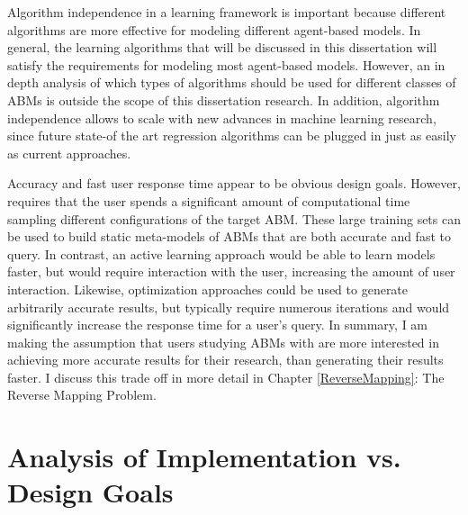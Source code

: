 Algorithm independence in a learning framework is important because different algorithms are more effective for modeling different agent-based models.
In general, the learning algorithms that will be discussed in this dissertation will satisfy the requirements for modeling most agent-based models.
However, an in depth analysis of which types of algorithms should be used for different classes of ABMs is outside the scope of this dissertation research.
In addition, algorithm independence allows \fw to scale with new advances in machine learning research, since future state-of the art regression algorithms can be plugged in just as easily as current approaches.

Accuracy and fast user response time appear to be obvious design goals.
However, \fw requires that the user spends a significant amount of computational time sampling different configurations of the target ABM.
These large training sets can be used to build static meta-models of ABMs that are both accurate and fast to query.
In contrast, an active learning approach would be able to learn models faster, but would require interaction with the user, increasing the amount of user interaction.
Likewise, optimization approaches could be used to generate arbitrarily accurate results, but typically require numerous iterations and would significantly increase the response time for a user's query.
In summary, I am making the assumption that users studying ABMs with \fw are more interested in achieving more accurate results for their research, than generating their results faster.
I discuss this trade off in more detail in Chapter \ref{ReverseMapping}: The Reverse Mapping Problem.


\section{Analysis of Implementation vs. Design Goals}


